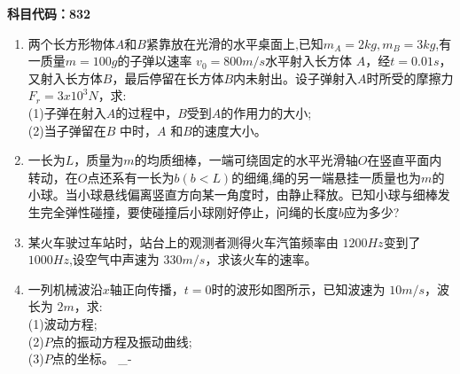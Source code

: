 \textbf{科目代码：832}
\begin{enumerate}
\item 两个长方形物体$A$和$B$紧靠放在光滑的水平桌面上,已知$m_A=2kg,m_B=3kg$,有一质量$ m=100g$的子弹以速率 $v_0=800m/s$水平射入长方体 $A$，经$t=0.01s$，又射入长方体$B$，最后停留在长方体$B$内未射出。设子弹射入$A$时所受的摩擦力$F_r=3x10^3N$，求:\\
(1)子弹在射入$A$的过程中，$B $受到$A$的作用力的大小;\\
(2)当子弹留在$ B$ 中时，$A$ 和$B$的速度大小。
\item 一长为$L$，质量为$m$的均质细棒，一端可绕固定的水平光滑轴$O$在竖直平面内转动，在$O$点还系有一长为$b(b<L)$的细绳,绳的另一端悬挂一质量也为$m$的小球。当小球悬线偏离竖直方向某一角度时，由静止释放。已知小球与细棒发生完全弹性碰撞，要使碰撞后小球刚好停止，问绳的长度$b$应为多少?
\item 某火车驶过车站时，站台上的观测者测得火车汽笛频率由 $1200Hz$变到了 $1000 Hz$,设空气中声速为 $330m/s$，求该火车的速率。
\item 一列机械波沿$x$轴正向传播，$t=0$时的波形如图所示，已知波速为 $10m/s$，波长为 $2m$，求:\\
(1)波动方程;\\
(2)$P$点的振动方程及振动曲线;\\
(3)$P $点的坐标。
\int_{-\infty}
\end{enumerate}
